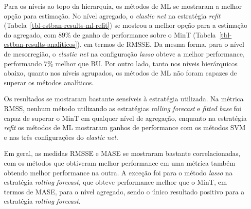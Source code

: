 \documentclass[
  12pt,
  twoside,
  openright,
  a4paper,
  chapter=TITLE,
  section=TITLE,
  brazil]{abntex2}
\begin{document}
Para os níveis ao topo da hierarquia, os métodos de ML se mostraram a
melhor opção para estimação. No nível agregado, o \emph{elastic net} na
estratégia \emph{refit} (Tabela~\ref{tbl-estban-results-ml-refit}) se
mostrou a melhor opção para a estimação do agregado, com 89\% de ganho
de performance sobre o MinT
(Tabela~\ref{tbl-estban-results-analiticos}), em termos de RMSSE. Da
mesma forma, para o nível de mesorregião, o \emph{elastic net} na
configuração \emph{lasso} obteve a melhor performance, performando 7\%
melhor que BU. Por outro lado, tanto nos níveis hierárquicos abaixo,
quanto nos níveis agrupados, os métodos de ML não foram capazes de
superar os métodos analíticos.

Os resultados se mostraram bastante sensíveis à estratégia utilizada. Na
métrica RMSS, nenhum método utilizando as estratégias \emph{rolling
forecast} e \emph{fitted base} foi capaz de superar o MinT em qualquer
nível de agregação, enquanto na estratégia \emph{refit} os métodos de ML
mostraram ganhos de performance com os métodos SVM e nas três
configurações do \emph{elastic net}.

Em geral, as medidas RMSSE e MASE se mostraram bastante correlacionadas,
com os métodos que obtiveram melhor performance em uma métrica também
obtendo melhor performance na outra. A exceção foi para o método
\emph{lasso} na estratégia \emph{rolling forecast}, que obteve
performance melhor que o MinT, em termos de MASE, para o nível agregado,
sendo o único resultado positivo para a estratégia \emph{rolling
forecast}.
\end{document}
